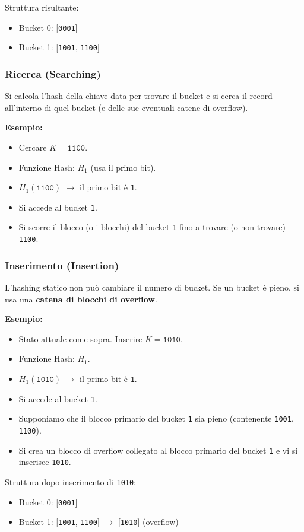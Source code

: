 Struttura risultante:
\begin{itemize}
    \item Bucket 0: [\texttt{0001}]
    \item Bucket 1: [\texttt{1001}, \texttt{1100}]
\end{itemize}

\subsubsection{Ricerca (Searching)}
Si calcola l'hash della chiave data per trovare il bucket e si cerca il record all'interno di quel bucket (e delle sue eventuali catene di overflow).

\textbf{Esempio:}
\begin{itemize}
    \item Cercare $K = \texttt{1100}$.
    \item Funzione Hash: $H_1$ (usa il primo bit).
    \item $H_1(\texttt{1100})$ $\rightarrow$ il primo bit è \texttt{1}.
    \item Si accede al bucket \texttt{1}.
    \item Si scorre il blocco (o i blocchi) del bucket \texttt{1} fino a trovare (o non trovare) \texttt{1100}.
\end{itemize}

\subsubsection{Inserimento (Insertion)}
L'hashing statico non può cambiare il numero di bucket. Se un bucket è pieno, si usa una \textbf{catena di blocchi di overflow}.

\textbf{Esempio:}
\begin{itemize}
    \item Stato attuale come sopra. Inserire $K = \texttt{1010}$.
    \item Funzione Hash: $H_1$.
    \item $H_1(\texttt{1010})$ $\rightarrow$ il primo bit è \texttt{1}.
    \item Si accede al bucket \texttt{1}.
    \item Supponiamo che il blocco primario del bucket \texttt{1} sia pieno (contenente \texttt{1001}, \texttt{1100}).
    \item Si crea un blocco di overflow collegato al blocco primario del bucket \texttt{1} e vi si inserisce \texttt{1010}.
\end{itemize}
Struttura dopo inserimento di \texttt{1010}:
\begin{itemize}
    \item Bucket 0: [\texttt{0001}]
    \item Bucket 1: [\texttt{1001}, \texttt{1100}] $\rightarrow$ [\texttt{1010}] (overflow)
\end{itemize}

